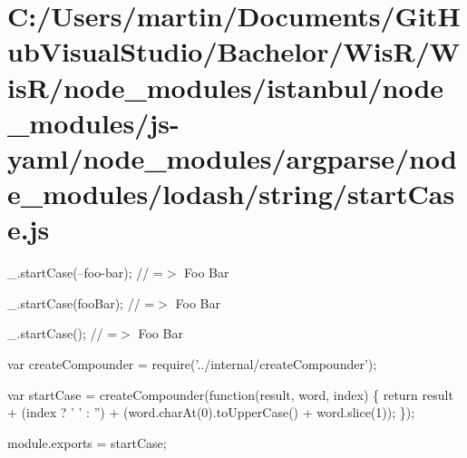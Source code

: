 \hypertarget{_c_1_2_users_2martin_2_documents_2_git_hub_visual_studio_2_bachelor_2_wis_r_2_wis_r_2node_module7f77cc02039ba3294acefd9c038ac3a0}{}\section{C\+:/\+Users/martin/\+Documents/\+Git\+Hub\+Visual\+Studio/\+Bachelor/\+Wis\+R/\+Wis\+R/node\+\_\+modules/istanbul/node\+\_\+modules/js-\/yaml/node\+\_\+modules/argparse/node\+\_\+modules/lodash/string/start\+Case.\+js}
\+\_\+.\+start\+Case(\textquotesingle{}--foo-\/bar\textquotesingle{}); // =$>$ \textquotesingle{}Foo Bar\textquotesingle{}

\+\_\+.\+start\+Case(\textquotesingle{}foo\+Bar\textquotesingle{}); // =$>$ \textquotesingle{}Foo Bar\textquotesingle{}

\+\_\+.\+start\+Case(\textquotesingle{}); // =$>$ \textquotesingle{}Foo Bar\textquotesingle{}


\begin{DoxyCodeInclude}
var createCompounder = require(\textcolor{stringliteral}{'../internal/createCompounder'});

var startCase = createCompounder(\textcolor{keyword}{function}(result, word, index) \{
  \textcolor{keywordflow}{return} result + (index ? \textcolor{charliteral}{' '} : \textcolor{stringliteral}{''}) + (word.charAt(0).toUpperCase() + word.slice(1));
\});

module.exports = startCase;
\end{DoxyCodeInclude}
 